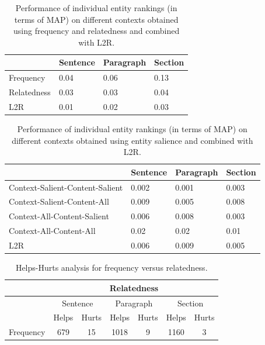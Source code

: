 \begin{table}[]
\caption{Performance of individual entity rankings (in terms of MAP) on different contexts obtained using frequency and relatedness and combined with L2R.}
\label{tab:Results-Entity-Rankings-Freq-And-Rel}
\begin{tabular}{@{}llll@{}}
 \toprule
            & Sentence & Paragraph & Section \\ \midrule
Frequency   & 0.04     & 0.06      & 0.13    \\
Relatedness & 0.03     & 0.03      & 0.04    \\ \midrule
L2R         & 0.01     & 0.02      & 0.03   \\
 \bottomrule
\end{tabular}
\end{table}



\begin{table}[t]
\caption{Performance of individual entity rankings (in terms of MAP) on different contexts obtained using entity salience and combined with L2R.}
\label{tab:Results-Entity-Rankings-Sal}
\begin{tabular}{@{}llll@{}}
\toprule
                                & Sentence & Paragraph & Section \\ \midrule
Context-Salient-Content-Salient & 0.002    & 0.001     & 0.003   \\
Context-Salient-Content-All     & 0.009    & 0.005     & 0.008   \\
Context-All-Content-Salient     & 0.006    & 0.008     & 0.003   \\
Context-All-Content-All         & 0.02     & 0.02      & 0.01    \\ \midrule
L2R                             & 0.006    & 0.009     & 0.005   \\ \bottomrule
\end{tabular}
\end{table}

\begin{table}[t]
\caption{Helps-Hurts analysis for frequency versus relatedness.}
\label{tab:Helps-Hurts-Analysis}
\begin{tabular}{|l|c|c|c|c|c|c|}
\hline
                                & \multicolumn{6}{c|}{Relatedness}                                                              \\ \hline
                                & \multicolumn{2}{c|}{Sentence} & \multicolumn{2}{c|}{Paragraph} & \multicolumn{2}{c|}{Section} \\ \hline
                                & Helps         & Hurts         & Helps          & Hurts         & Helps         & Hurts        \\ \hline
\multicolumn{1}{|c|}{Frequency} & 679           & 15            & 1018           & 9             & 1160          & 3            \\ \hline
\end{tabular}
\end{table}

